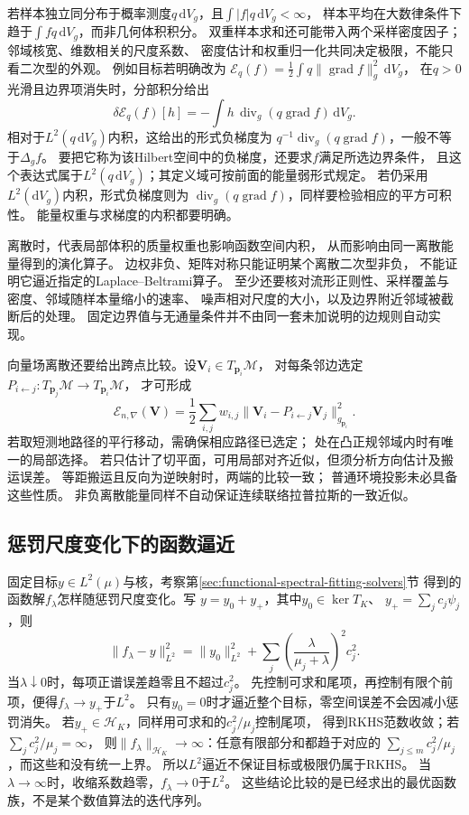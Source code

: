 若样本独立同分布于概率测度$q\,\mathrm dV_g$，且$\int|f|q\,\mathrm dV_g<\infty$，
样本平均在大数律条件下趋于$\int f q\,\mathrm dV_g$，而非几何体积积分。
双重样本求和还可能带入两个采样密度因子；邻域核宽、维数相关的尺度系数、
密度估计和权重归一化共同决定极限，不能只看二次型的外观。
例如目标若明确改为
$\mathcal E_q(f)=\frac12\int q\lVert\operatorname{grad}f\rVert_g^2\,\mathrm dV_g$，
在$q>0$光滑且边界项消失时，分部积分给出
\[
 \delta\mathcal E_q(f)[h]
 =-\int h\,\operatorname{div}_g(q\operatorname{grad}f)\,\mathrm dV_g.
\]
相对于$L^2(q\,\mathrm dV_g)$内积，这给出的形式负梯度为
$q^{-1}\operatorname{div}_g(q\operatorname{grad}f)$，一般不等于$\Delta_gf$。
要把它称为该Hilbert空间中的负梯度，还要求$f$满足所选边界条件，
且这个表达式属于$L^2(q\,\mathrm dV_g)$；其定义域可按前面的能量弱形式规定。
若仍采用$L^2(\mathrm dV_g)$内积，形式负梯度则为
$\operatorname{div}_g(q\operatorname{grad}f)$，同样要检验相应的平方可积性。
能量权重与求梯度的内积都要明确。

离散时，代表局部体积的质量权重也影响函数空间内积，
从而影响由同一离散能量得到的演化算子。
边权非负、矩阵对称只能证明某个离散二次型非负，
不能证明它逼近指定的Laplace--Beltrami算子。
至少还要核对流形正则性、采样覆盖与密度、邻域随样本量缩小的速率、
噪声相对尺度的大小，以及边界附近邻域被截断后的处理。
固定边界值与无通量条件并不由同一套未加说明的边规则自动实现。

向量场离散还要给出跨点比较。设$\bm V_i\in T_{\bm p_i}\mathcal M$，
对每条邻边选定$P_{i\leftarrow j}:T_{\bm p_j}\mathcal M\to T_{\bm p_i}\mathcal M$，
才可形成
\[
 \mathcal E_{n,\nabla}(\bm V)
 =\frac12\sum_{i,j}w_{i,j}
      \lVert\bm V_i-P_{i\leftarrow j}\bm V_j\rVert_{g_{\bm p_i}}^2.
\]
若取短测地路径的平行移动，需确保相应路径已选定；
处在凸正规邻域内时有唯一的局部选择。
若只估计了切平面，可用局部对齐近似，但须分析方向估计及搬运误差。
等距搬运且反向为逆映射时，两端的比较一致；
普通环境投影未必具备这些性质。
非负离散能量同样不自动保证连续联络拉普拉斯的一致近似。

\subsection{惩罚尺度变化下的函数逼近}
\label{sec:functional-penalty-scale-approximation}

固定目标$y\in L^2(\mu)$与核，考察第\ref{sec:functional-spectral-fitting-solvers}节
得到的函数解$f_\lambda$怎样随惩罚尺度变化。写
$y=y_0+y_+$，其中$y_0\in\ker T_K$、
$y_+=\sum_jc_j\psi_j$，则
\[
 \lVert f_\lambda-y\rVert_{L^2}^2
 =\lVert y_0\rVert_{L^2}^2+
   \sum_j\left(\frac{\lambda}{\mu_j+\lambda}\right)^2c_j^2.
\]
当$\lambda\downarrow0$时，每项正谱误差趋零且不超过$c_j^2$。
先控制可求和尾项，再控制有限个前项，便得$f_\lambda\to y_+$于$L^2$。
只有$y_0=0$时才逼近整个目标，零空间误差不会因减小惩罚消失。
若$y_+\in\mathcal H_K$，同样用可求和的$c_j^2/\mu_j$控制尾项，
得到RKHS范数收敛；若$\sum_jc_j^2/\mu_j=\infty$，
则$\lVert f_\lambda\rVert_{\mathcal H_K}\to\infty$：任意有限部分和都趋于对应的
$\sum_{j\leq m}c_j^2/\mu_j$，而这些和没有统一上界。
所以$L^2$逼近不保证目标或极限仍属于RKHS。
当$\lambda\to\infty$时，收缩系数趋零，$f_\lambda\to0$于$L^2$。
这些结论比较的是已经求出的最优函数族，不是某个数值算法的迭代序列。


